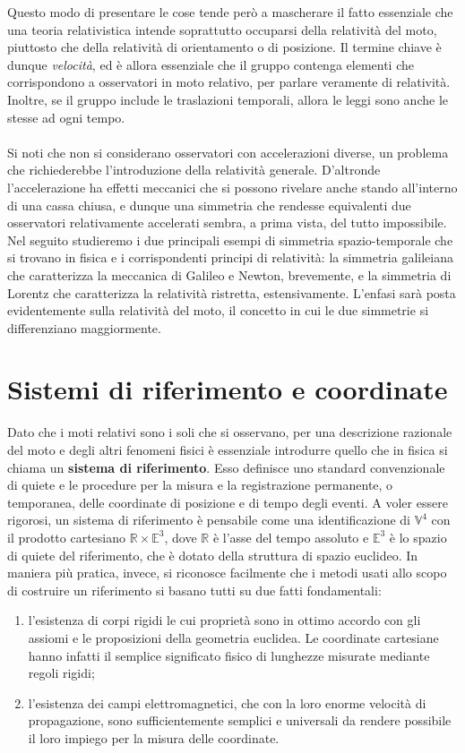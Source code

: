 \documentclass[a4paper,11pt]{book}
\theoremstyle{plain}
\theoremstyle{definition}
\begin{document}
Questo modo di presentare le cose tende però a mascherare il fatto essenziale che una 
teoria relativistica intende soprattutto occuparsi della relatività del moto, piuttosto che 
della relatività di orientamento o di posizione. Il termine chiave è dunque \emph{velocità}, ed è
allora essenziale che il gruppo contenga elementi che corrispondono a osservatori in moto 
relativo, per parlare veramente di relatività. Inoltre, se il gruppo include le traslazioni temporali, 
allora le leggi sono anche le stesse ad ogni tempo. \\ \\
Si noti che non si considerano osservatori con accelerazioni diverse, un problema che 
richiederebbe l'introduzione della relatività generale. D'altronde l'accelerazione ha effetti 
meccanici che si possono rivelare anche stando all'interno di una cassa chiusa, e dunque 
una simmetria che rendesse equivalenti due osservatori relativamente accelerati sembra, a 
prima vista, del tutto impossibile. 
Nel seguito studieremo i due principali esempi di simmetria spazio-temporale che si trovano in fisica e i corrispondenti principi di relatività: la simmetria galileiana che caratterizza la meccanica di Galileo e Newton, brevemente, e la simmetria di Lorentz che caratterizza 
la relatività ristretta, estensivamente. L'enfasi sarà posta evidentemente sulla relatività
del moto, il concetto in cui le due simmetrie si differenziano maggiormente. 

\section{Sistemi di riferimento e coordinate}
Dato che i moti relativi sono i soli che si osservano, per una descrizione razionale del moto 
e degli altri fenomeni fisici è essenziale introdurre quello che in fisica si chiama un \textbf{sistema 
di riferimento}. Esso definisce uno standard convenzionale di quiete e le procedure per 
la misura e la registrazione permanente, o temporanea, delle coordinate di posizione e di 
tempo degli eventi. A voler essere rigorosi, un sistema di riferimento è pensabile come una identificazione di $\mathbb{V}^4$ con il prodotto cartesiano $\mathbb{R}\times \mathbb{E}^3$, dove $\mathbb{R}$ è l'asse del tempo 
assoluto e $\mathbb{E}^3$ è lo spazio di quiete del riferimento, che è dotato della struttura di spazio euclideo. In maniera più pratica, invece, si riconosce facilmente che i metodi usati allo scopo di costruire un riferimento si basano tutti su due fatti fondamentali:
\begin{enumerate}
	\item l'esistenza di corpi rigidi le cui proprietà sono in ottimo accordo con gli assiomi e le proposizioni della geometria euclidea. Le coordinate cartesiane hanno infatti il semplice significato fisico di lunghezze misurate mediante regoli 
rigidi;

	\item l’esistenza dei campi elettromagnetici, che con la loro enorme 
velocità di propagazione, sono sufficientemente semplici e universali da rendere possibile il 
loro impiego per la misura delle coordinate. 
\end{enumerate}
\end{document}
